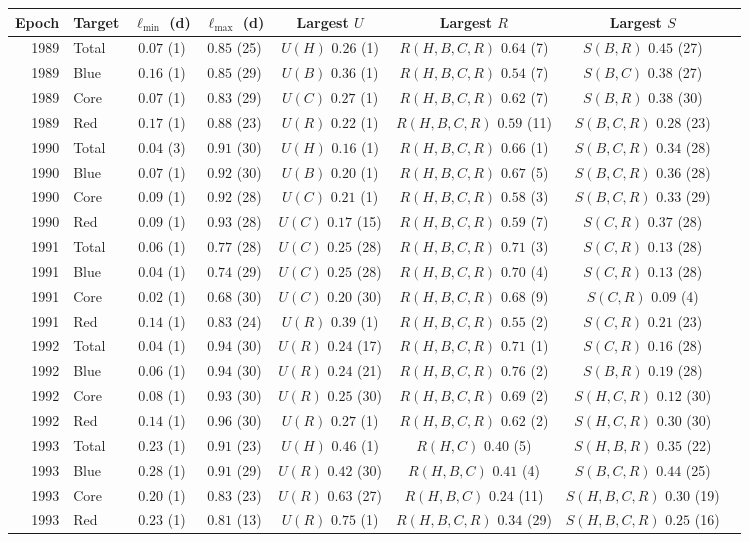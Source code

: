 \begin{tabular}{rlcccccc}
\toprule
Epoch & Target & $\ell_{\min}$ (d) & $\ell_{\max}$ (d) & Largest $U$ & Largest $R$ & Largest $S$ \\
\midrule
1989 & Total & $0.07$ (1) & $0.85$ (25) & $U(H)$ $0.26$ (1) & $R(H,B,C,R)$ $0.64$ (7) & $S(B,R)$ $0.45$ (27) \\
1989 & Blue & $0.16$ (1) & $0.85$ (29) & $U(B)$ $0.36$ (1) & $R(H,B,C,R)$ $0.54$ (7) & $S(B,C)$ $0.38$ (27) \\
1989 & Core & $0.07$ (1) & $0.83$ (29) & $U(C)$ $0.27$ (1) & $R(H,B,C,R)$ $0.62$ (7) & $S(B,R)$ $0.38$ (30) \\
1989 & Red & $0.17$ (1) & $0.88$ (23) & $U(R)$ $0.22$ (1) & $R(H,B,C,R)$ $0.59$ (11) & $S(B,C,R)$ $0.28$ (23) \\
\midrule
1990 & Total & $0.04$ (3) & $0.91$ (30) & $U(H)$ $0.16$ (1) & $R(H,B,C,R)$ $0.66$ (1) & $S(B,C,R)$ $0.34$ (28) \\
1990 & Blue & $0.07$ (1) & $0.92$ (30) & $U(B)$ $0.20$ (1) & $R(H,B,C,R)$ $0.67$ (5) & $S(B,C,R)$ $0.36$ (28) \\
1990 & Core & $0.09$ (1) & $0.92$ (28) & $U(C)$ $0.21$ (1) & $R(H,B,C,R)$ $0.58$ (3) & $S(B,C,R)$ $0.33$ (29) \\
1990 & Red & $0.09$ (1) & $0.93$ (28) & $U(C)$ $0.17$ (15) & $R(H,B,C,R)$ $0.59$ (7) & $S(C,R)$ $0.37$ (28) \\
\midrule
1991 & Total & $0.06$ (1) & $0.77$ (28) & $U(C)$ $0.25$ (28) & $R(H,B,C,R)$ $0.71$ (3) & $S(C,R)$ $0.13$ (28) \\
1991 & Blue & $0.04$ (1) & $0.74$ (29) & $U(C)$ $0.25$ (28) & $R(H,B,C,R)$ $0.70$ (4) & $S(C,R)$ $0.13$ (28) \\
1991 & Core & $0.02$ (1) & $0.68$ (30) & $U(C)$ $0.20$ (30) & $R(H,B,C,R)$ $0.68$ (9) & $S(C,R)$ $0.09$ (4) \\
1991 & Red & $0.14$ (1) & $0.83$ (24) & $U(R)$ $0.39$ (1) & $R(H,B,C,R)$ $0.55$ (2) & $S(C,R)$ $0.21$ (23) \\
\midrule
1992 & Total & $0.04$ (1) & $0.94$ (30) & $U(R)$ $0.24$ (17) & $R(H,B,C,R)$ $0.71$ (1) & $S(C,R)$ $0.16$ (28) \\
1992 & Blue & $0.06$ (1) & $0.94$ (30) & $U(R)$ $0.24$ (21) & $R(H,B,C,R)$ $0.76$ (2) & $S(B,R)$ $0.19$ (28) \\
1992 & Core & $0.08$ (1) & $0.93$ (30) & $U(R)$ $0.25$ (30) & $R(H,B,C,R)$ $0.69$ (2) & $S(H,C,R)$ $0.12$ (30) \\
1992 & Red & $0.14$ (1) & $0.96$ (30) & $U(R)$ $0.27$ (1) & $R(H,B,C,R)$ $0.62$ (2) & $S(H,C,R)$ $0.30$ (30) \\
\midrule
1993 & Total & $0.23$ (1) & $0.91$ (23) & $U(H)$ $0.46$ (1) & $R(H,C)$ $0.40$ (5) & $S(H,B,R)$ $0.35$ (22) \\
1993 & Blue & $0.28$ (1) & $0.91$ (29) & $U(R)$ $0.42$ (30) & $R(H,B,C)$ $0.41$ (4) & $S(B,C,R)$ $0.44$ (25) \\
1993 & Core & $0.20$ (1) & $0.83$ (23) & $U(R)$ $0.63$ (27) & $R(H,B,C)$ $0.24$ (11) & $S(H,B,C,R)$ $0.30$ (19) \\
1993 & Red & $0.23$ (1) & $0.81$ (13) & $U(R)$ $0.75$ (1) & $R(H,B,C,R)$ $0.34$ (29) & $S(H,B,C,R)$ $0.25$ (16) \\
\bottomrule
\end{tabular}
